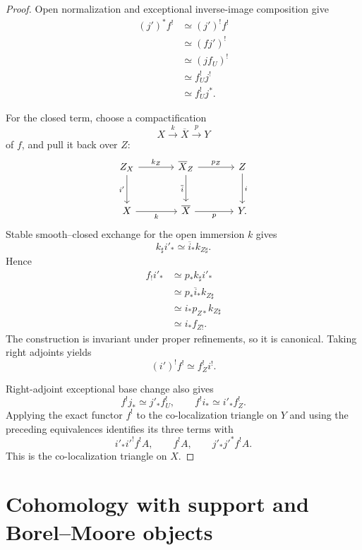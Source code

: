 \begin{proof}
Open normalization and exceptional inverse-image composition give
\[
\begin{aligned}
    (j')^*f^!
    &\simeq
    (j')^!f^! \\
    &\simeq
    (fj')^! \\
    &\simeq
    (jf_U)^! \\
    &\simeq
    f_U^!j^! \\
    &\simeq
    f_U^!j^*.
\end{aligned}
\]

For the closed term, choose a compactification
\[
    X\xrightarrow{k}\overline X\xrightarrow{p}Y
\]
of \(f\), and pull it back over \(Z\):
\[
\begin{tikzcd}[column sep=large,row sep=large]
    Z_X \arrow[r,"k_Z"] \arrow[d,"i'"']
        & \overline X_Z \arrow[r,"p_Z"] \arrow[d,"\overline i"']
        & Z \arrow[d,"i"] \\
    X \arrow[r,"k"']
        & \overline X \arrow[r,"p"']
        & Y.
\end{tikzcd}
\]
Stable smooth--closed exchange for the open immersion \(k\) gives
\[
    k_\sharp i'_*
    \simeq
    \overline i_*k_{Z\sharp}.
\]
Hence
\[
\begin{aligned}
    f_!i'_*
    &\simeq
    p_*k_\sharp i'_* \\
    &\simeq
    p_*\overline i_*k_{Z\sharp} \\
    &\simeq
    i_*p_{Z*}k_{Z\sharp} \\
    &\simeq
    i_*f_{Z!}.
\end{aligned}
\]
The construction is invariant under proper refinements, so it is canonical.
Taking right adjoints yields
\[
    (i')^!f^!
    \simeq
    f_Z^!i^!.
\]

Right-adjoint exceptional base change also gives
\[
    f^!j_*
    \simeq
    j'_*f_U^!,
    \qquad
    f^!i_*
    \simeq
    i'_*f_Z^!.
\]
Applying the exact functor \(f^!\) to the co-localization triangle on \(Y\)
and using the preceding equivalences identifies its three terms with
\[
    i'_*i'^!f^!A,
    \qquad
    f^!A,
    \qquad
    j'_*j'^*f^!A.
\]
This is the co-localization triangle on \(X\).
\end{proof}

\section{Cohomology with support and Borel--Moore objects}
\label{sec:six-borel-moore}

